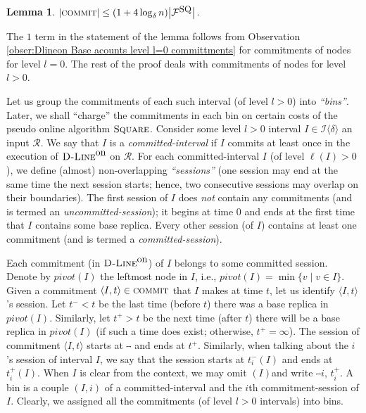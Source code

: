 \documentclass[11pt]{article}
\newtheorem{lem}[theorem]{Lemma}
\newcommand{\lfun}[1]{\ell(#1)}
\newcommand{\calI}{\mathcal{I}}
\newcommand{\calF}{\mathcal{F}}
\newcommand{\calR}{\mathcal{R}}
\newcommand{\Square}[0]{\mbox{\sc Square}}
\newcommand{\tminus}[2]{t^{-}_{#1}#2}
\newcommand{\tplus}[1]{t^{+}_{#1}}
\newcommand{\Dlineon}[0]{\mbox{{\sc D-Line}}^{\mbox{\upshape on}}}
\newcommand{\FSQ}[0]{\calF^{\mbox{\small\upshape SQ}}}
\newcommand{\pivot}[0]{pivot}
\newcommand{\DCOMMIT}[0]{\mbox{\sc commit}}
\begin{document}
\vspace{0.2cm}
\begin{lem}
$|\DCOMMIT|
\leq (1+4\log_\delta n)\big|\FSQ\big|
$.
\label{lem:Dlineon: storage cost < Hoff + Aoff}
\end{lem}
The $1$ term in the statement of the lemma follows from Observation \ref{obser:Dlineon Base acounts level l=0 committments} for commitments of nodes for level $l=0$.
The rest of the proof deals with commitments of nodes for level $l>0$.

Let us group the commitments of each such interval (of level $l>0$) into {\em ``bins''}.
Later, we shall ``charge'' the commitments in each bin on certain costs of the pseudo online algorithm $\Square$.
Consider some level $l>0$ interval $I\in\calI\langle\delta\rangle$ an input $\calR$.
We say that $I$ is a {\em committed-interval} if $I$ commits at least once in the execution of $\Dlineon$ on $\calR$.
For each committed-interval $I$ (of level $\lfun{I}>0$),
we define (almost) non-overlapping {\em``sessions''}
(one session may end at the same time the next session starts;
hence, two consecutive sessions may overlap on their boundaries).
The first session of
$I$ does {\em not} contain any commitments (and is termed an {\em uncommitted-session}); it begins at time $0$ and ends at the first time that $I$ contains some base replica.
Every other session (of $I$) contains at least one commitment (and is termed a {\em committed-session}).


Each commitment (in $\Dlineon$) of $I$ belongs to some committed session.
Denote by $\pivot(I)$ the leftmost node in $I$, i.e., $\pivot(I)=\min\{v \mid v\in I\}$.
Given a commitment $\langle I,t\rangle\in\DCOMMIT$ that $I$ makes at time $t$,
let us identify $\langle I,t\rangle$'s session. Let $t^{-}< t$ be the last time (before $t$) there was a base replica in $\pivot(I)$.
Similarly, let $\tplus{}> t$ be the next time (after $t$) there will be a base replica in $\pivot(I)$
(if such a time does exist; otherwise, $\tplus{}=\infty$).
The session of commitment $\langle I,t\rangle$ starts at $\tminus{}$ and ends at $\tplus{}$.
Similarly, when talking about the $i$'s session of interval $I$, we say that the session starts at $\tminus{i}(I)$
and ends at $\tplus{i}(I)$.
When $I$ is clear from the context, we may omit $(I)$and write $\tminus{i}$, $\tplus{i}$.
A bin is a couple $(I,i)$ of a committed-interval and the $i$th commitment-session of $I$.
Clearly, we assigned all the commitments (of level $l>0$ intervals) into bins.
\end{document}
